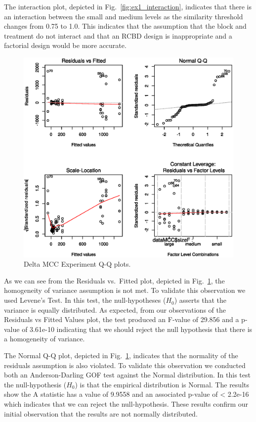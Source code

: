 \documentclass[conference]{IEEEtran}
\begin{document}
The interaction plot, depicted in Fig.~\ref{fig:ex1_interaction},
indicates that there is an interaction between the small and medium
levels as the similarity threshold changes from 0.75 to 1.0. This
indicates that the assumption that the block and treatment do not
interact and that an RCBD design is inappropriate and a factorial design
would be more accurate.

\begin{figure}
\hypertarget{fig:ex2_qqplots}{%
\centering
\includegraphics{images/paper/results/ex2_qqplots.eps}
\caption{Delta MCC Experiment Q-Q plots.}\label{fig:ex2_qqplots}
}
\end{figure}

As we can see from the Residuals vs.~Fitted plot, depicted in
Fig.~\ref{fig:ex2_qqplots}, the homogeneity of variance assumption is
not met. To validate this observation we used Levene's Test. In this
test, the null-hypotheses (\(H_0\)) asserts that the variance is equally
distributed. As expected, from our observations of the Residuals vs
Fitted Values plot, the test produced an F-value of 29.856 and a p-value
of 3.61e-10 indicating that we should reject the null hypothesis that
there is a homogeneity of variance.

The Normal Q-Q plot, depicted in Fig.~\ref{fig:ex2_qqplots}, indicates
that the normality of the residuals assumption is also violated. To
validate this observation we conducted both an Anderson-Darling GOF test
against the Normal distribution. In this test the null-hypothesis
(\(H_0\)) is that the empirical distribution is Normal. The results show
the A statistic has a value of 9.9558 and an associated p-value of
\textless{} 2.2e-16 which indicates that we can reject the
null-hypothesis. These results confirm our initial observation that the
results are not normally distributed.
\end{document}
